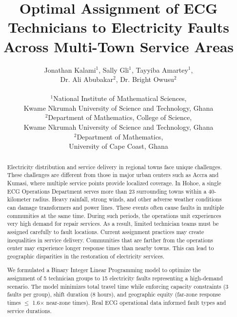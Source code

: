 \documentclass[11pt]{article}
\title{\bfseries Optimal Assignment of ECG Technicians to Electricity Faults Across Multi-Town Service Areas\\}
\author{
\centering
\begin{tabular}{c}
Jonathan Kalami$^{1}$, Sally Gli$^{1}$, Tayyiba Amartey$^{1}$,\\
Dr. Ali Abubakar$^{2}$, Dr. Bright Owusu$^{2}$ \\
\\
$^{1}$National Institute of Mathematical Sciences,\\ Kwame Nkrumah University of Science and Technology, Ghana\\
$^{2}$Department of Mathematics, College of Science,\\ Kwame Nkrumah University of Science and Technology, Ghana \\
$^{2}$Department of Mathematics,\\ University of Cape Coast, Ghana
\end{tabular}
}
\date{}
\begin{document}
\maketitle

\begin{abstract}
\noindent Electricity distribution and service delivery in regional towns face unique challenges. These challenges are different from those in major urban centers such as Accra and Kumasi, where multiple service points provide localized coverage. In Hohoe, a single ECG Operations Department serves more than 23 surrounding towns within a 40-kilometer radius. Heavy rainfall, strong winds, and other adverse weather conditions can damage transformers and power lines. These events often cause faults in multiple communities at the same time. During such periods, the operations unit experiences very high demand for repair services. As a result, limited technician teams must be assigned carefully to fault locations. Current assignment practices may create inequalities in service delivery. Communities that are farther from the operations center may experience longer response times than nearby towns. This can lead to geographic disparities in the restoration of electricity services.

\vspace{0.25cm}
\noindent We formulated a Binary Integer Linear Programming model to optimize the assignment of 5 technician groups to 15 electricity faults representing a high-demand scenario. The model minimizes total travel time while enforcing capacity constraints (3 faults per group), shift duration (8 hours), and geographic equity (far-zone response times $\leq$ 1.6× near-zone times). Real ECG operational data informed fault types and service durations.


\end{abstract}
\end{document}
